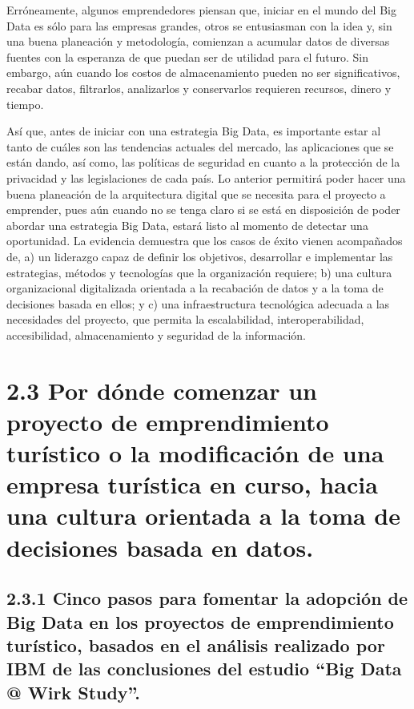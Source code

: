 \documentclass[
  letterpaper,
  DIV=11,
  numbers=noendperiod]{scrreprt}
\begin{document}
Erróneamente, algunos emprendedores piensan que, iniciar en el mundo del
Big Data es sólo para las empresas grandes, otros se entusiasman con la
idea y, sin una buena planeación y metodología, comienzan a acumular
datos de diversas fuentes con la esperanza de que puedan ser de utilidad
para el futuro. Sin embargo, aún cuando los costos de almacenamiento
pueden no ser significativos, recabar datos, filtrarlos, analizarlos y
conservarlos requieren recursos, dinero y tiempo.

Así que, antes de iniciar con una estrategia Big Data, es importante
estar al tanto de cuáles son las tendencias actuales del mercado, las
aplicaciones que se están dando, así como, las políticas de seguridad en
cuanto a la protección de la privacidad y las legislaciones de cada
país. Lo anterior permitirá poder hacer una buena planeación de la
arquitectura digital que se necesita para el proyecto a emprender, pues
aún cuando no se tenga claro si se está en disposición de poder abordar
una estrategia Big Data, estará listo al momento de detectar una
oportunidad. La evidencia demuestra que los casos de éxito vienen
acompañados de, a) un liderazgo capaz de definir los objetivos,
desarrollar e implementar las estrategias, métodos y tecnologías que la
organización requiere; b) una cultura organizacional digitalizada
orientada a la recabación de datos y a la toma de decisiones basada en
ellos; y c) una infraestructura tecnológica adecuada a las necesidades
del proyecto, que permita la escalabilidad, interoperabilidad,
accesibilidad, almacenamiento y seguridad de la información.

\hypertarget{por-duxf3nde-comenzar-un-proyecto-de-emprendimiento-turuxedstico-o-la-modificaciuxf3n-de-una-empresa-turuxedstica-en-curso-hacia-una-cultura-orientada-a-la-toma-de-decisiones-basada-en-datos.-1}{%
\section{2.3 Por dónde comenzar un proyecto de emprendimiento turístico
o la modificación de una empresa turística en curso, hacia una cultura
orientada a la toma de decisiones basada en
datos.}\label{por-duxf3nde-comenzar-un-proyecto-de-emprendimiento-turuxedstico-o-la-modificaciuxf3n-de-una-empresa-turuxedstica-en-curso-hacia-una-cultura-orientada-a-la-toma-de-decisiones-basada-en-datos.-1}}

\hypertarget{cinco-pasos-para-fomentar-la-adopciuxf3n-de-big-data-en-los-proyectos-de-emprendimiento-turuxedstico-basados-en-el-anuxe1lisis-realizado-por-ibm-de-las-conclusiones-del-estudio-big-data-wirk-study.-1}{%
\subsection{2.3.1 Cinco pasos para fomentar la adopción de Big Data en
los proyectos de emprendimiento turístico, basados en el análisis
realizado por IBM de las conclusiones del estudio ``Big Data @ Wirk
Study''.}\label{cinco-pasos-para-fomentar-la-adopciuxf3n-de-big-data-en-los-proyectos-de-emprendimiento-turuxedstico-basados-en-el-anuxe1lisis-realizado-por-ibm-de-las-conclusiones-del-estudio-big-data-wirk-study.-1}}
\end{document}
